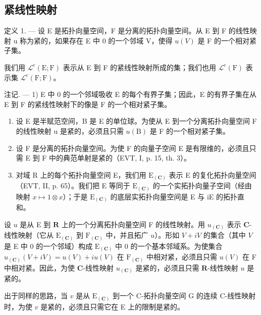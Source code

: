 \subsection{紧线性映射}

定义 1. --- 设 E 是拓扑向量空间，F 是分离的拓扑向量空间。从 E 到 F 的线性映射 u 称为紧的，如果存在 E 中 0 的一个邻域 V，使得 \(u(V)\) 是 F 的一个相对紧子集。

我们用 \(\mathcal{L}^{\mathrm{c}}(\mathrm{E};\mathrm{F})\) 表示从 E 到 F 的紧线性映射所成的集；我们也用 \(\mathcal{L}^{\mathrm{c}}(\mathrm{F})\) 表示集 \(\mathcal{L}^{\mathrm{c}}(\mathrm{F};\mathrm{F})\)。

注记. --- 1) E 中 0 的一个邻域吸收 E 的每个有界子集；因此，E 的有界子集在从 E 到 F 的紧线性映射下的像是 F 的一个相对紧子集。

\begin{enumerate}
\def\labelenumi{\arabic{enumi})}
\setcounter{enumi}{1}
\item
  设 E 是半赋范空间，B 是 E 的单位球。为使从 E 到一个分离拓扑向量空间 F 的线性映射 u 是紧的，必须且只需 \(u(\mathrm{B})\) 是 F 的一个相对紧子集。
\item
  设 F 是分离的拓扑向量空间。为使 F 的向量子空间 E 是有限维的，必须且只需 E 到 F 中的典范单射是紧的（EVT, I, p. 15, th. 3）。
\item
  对域 R 上的每个拓扑向量空间 E，我们用 \(\mathrm{E}_{(\mathbf{C})}\) 表示 E 的复化拓扑向量空间（EVT, II, p. 65）。我们把 E 等同于 \(\mathrm{E}_{(\mathbf{C})}\) 的一个实拓扑向量子空间（经由映射 \(x \mapsto 1 \otimes x\)）；于是 \(\mathrm{E}_{(\mathbf{C})}\) 的底层实拓扑向量空间是 E 与 iE 的拓扑直和。
\end{enumerate}

设 \(u\) 是从 E 到 \(\mathbf{R}\) 上的一个分离拓扑向量空间 F 的线性映射。用 \(u_{(\mathbf{C})}\) 表示 \(\mathbf{C}\)-线性映射（它从 \(\mathrm{E}_{(\mathbf{C})}\) 到 \(\mathrm{F}_{(\mathbf{C})}\) 中，并且拓广 \(u\)）。形如 \(V + iV\) 的集合（其中 \(V\) 是 E 中 0 的一个邻域）构成 \(\mathrm{E}_{(\mathbf{C})}\) 中 0 的一个基本邻域系。为使集合 \(u_{(\mathbf{C})}(V + iV) = u(V) + iu(V)\) 在 \(\mathrm{F}_{(\mathbf{C})}\) 中相对紧，必须且只需 \(u(V)\) 在 F 中相对紧。因此，为使 \(\mathbf{C}\)-线性映射 \(u_{(\mathbf{C})}\) 是紧的，必须且只需 \(\mathbf{R}\)-线性映射 \(u\) 是紧的。

出于同样的思路，当 \(v\) 是从 \(\mathrm{E}_{(\mathbf{C})}\) 到一个 C-拓扑向量空间 G 的连续 C-线性映射时，为使 \(v\) 是紧的，必须且只需它在 E 上的限制是紧的。

